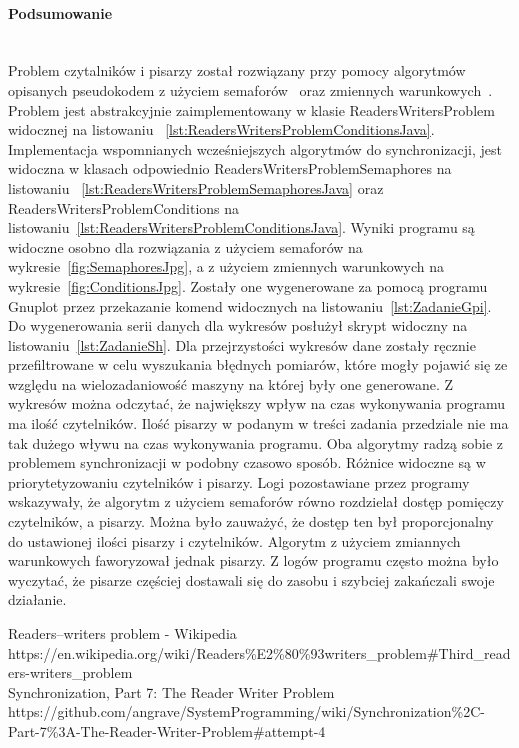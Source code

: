 \paragraph{Podsumowanie}~\\
Problem czytalników i pisarzy został rozwiązany przy pomocy algorytmów opisanych pseudokodem z użyciem semaforów~\cite{WikipediaReadersWritersProblem} oraz zmiennych warunkowych~\cite{GithubAngraveSystemProgrammingSynchronization7}.
Problem jest abstrakcyjnie zaimplementowany w klasie ReadersWritersProblem widocznej na listowaniu ~\ref{lst:ReadersWritersProblemConditionsJava}.
Implementacja wspomnianych wcześniejszych algorytmów do synchronizacji, jest widoczna w klasach odpowiednio ReadersWritersProblemSemaphores na listowaniu ~\ref{lst:ReadersWritersProblemSemaphoresJava} oraz ReadersWritersProblemConditions na listowaniu~\ref{lst:ReadersWritersProblemConditionsJava}.
Wyniki programu są widoczne osobno dla rozwiązania z użyciem semaforów na wykresie~\ref{fig:SemaphoresJpg}, a z użyciem zmiennych warunkowych na wykresie~\ref{fig:ConditionsJpg}.
Zostały one wygenerowane za pomocą programu Gnuplot przez przekazanie komend widocznych na listowaniu~\ref{lst:ZadanieGpi}.
Do wygenerowania serii danych dla wykresów posłużył skrypt widoczny na listowaniu~\ref{lst:ZadanieSh}.
Dla przejrzystości wykresów dane zostały ręcznie przefiltrowane w celu wyszukania błędnych pomiarów, które mogły pojawić się ze względu na wielozadaniowość maszyny na której były one generowane.
Z wykresów można odczytać, że największy wpływ na czas wykonywania programu ma ilość czytelników.
Ilość pisarzy w podanym w treści zadania przedziale nie ma tak dużego wływu na czas wykonywania programu.
Oba algorytmy radzą sobie z problemem synchronizacji w podobny czasowo sposób.
Różnice widoczne są w priorytetyzowaniu czytelników i pisarzy.
Logi pozostawiane przez programy wskazywały, że algorytm z użyciem semaforów równo rozdzielał dostęp pomięczy czytelników, a pisarzy.
Można było zauważyć, że dostęp ten był proporcjonalny do ustawionej ilości pisarzy i czytelników.
Algorytm z użyciem zmiannych warunkowych faworyzował jednak pisarzy.
Z logów programu często można było wyczytać, że pisarze częściej dostawali się do zasobu i szybciej zakańczali swoje działanie.

\begin{thebibliography}{9}
   Readers–writers problem - Wikipedia https://en.wikipedia.org/wiki/Readers\%E2\%80\%93writers\_problem\#Third\_readers-writers\_problem\\
   Synchronization, Part 7: The Reader Writer Problem https://github.com/angrave/SystemProgramming/wiki/Synchronization\%2C-Part-7\%3A-The-Reader-Writer-Problem\#attempt-4
\end{thebibliography}
